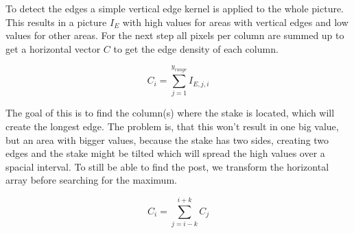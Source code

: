 To detect the edges a simple vertical edge kernel is applied to the whole picture. This results in a picture $I_E$ with high values for areas with vertical edges and low values for other areas. For the next step all pixels per column are summed up to get a horizontal vector $C$ to get the edge density of each column.

$$C_i = \sum_{j=1}^{y_{range}} I_{E,j,i}$$

The goal of this is to find the column(s) where the stake is located, which will create
the longest edge. The problem is, that this won't result in one big value, but an area with
bigger values, because the stake has two sides, creating two edges and the stake might 
be tilted which will spread the high values over a spacial interval.
To still be able to find the post, we transform the horizontal array before searching
for the maximum. 

$$C_{i} = \sum_{j=i-k}^{i+k} C_j$$

